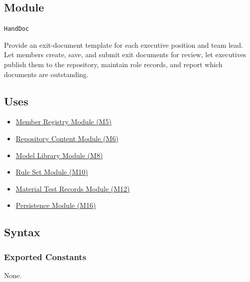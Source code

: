 \documentclass[12pt, titlepage]{article}
\begin{document}
\subsection{Module}
\texttt{HandDoc}

Provide an exit-document template for each executive position and team lead. Let members create, save, and submit exit documents for review, let executives publish them to the repository, maintain role records, and report which documents are outstanding.

\subsection{Uses}
\begin{itemize}
  \item \hyperref[mMembers]{Member Registry Module (M5)}
  \item \hyperref[mContent]{Repository Content Module (M6)}
  \item \hyperref[mModelLibrary]{Model Library Module (M8)}
  \item \hyperref[mRuleSet]{Rule Set Module (M10)}
  \item \hyperref[mTestRecords]{Material Test Records Module (M12)}
  \item \hyperref[mPersist]{Persistence Module (M16)}
\end{itemize}

\subsection{Syntax}

\subsubsection{Exported Constants}
None.
\end{document}
